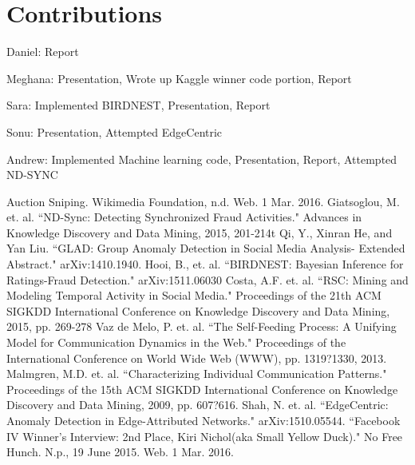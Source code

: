 \documentclass{article} %
\begin{document}
\section{Contributions}

Daniel: Report

Meghana: Presentation, Wrote up Kaggle winner code portion, Report

Sara: Implemented BIRDNEST, Presentation, Report

Sonu: Presentation, Attempted EdgeCentric 

Andrew: Implemented Machine learning code, Presentation, Report, Attempted ND-SYNC

\begin{thebibliography}{123}

 Auction Sniping. Wikimedia Foundation, n.d. Web. 1 Mar. 2016.
 Giatsoglou, M. et. al. ``ND-Sync: Detecting Synchronized Fraud Activities." Advances in Knowledge Discovery and Data Mining, 2015, 201-214t
 Qi, Y., Xinran He, and Yan Liu. ``GLAD: Group Anomaly Detection in Social Media Analysis- Extended Abstract." arXiv:1410.1940.
 Hooi, B., et. al. ``BIRDNEST: Bayesian Inference for Ratings-Fraud Detection." arXiv:1511.06030
 Costa, A.F. et. al. ``RSC: Mining and Modeling Temporal Activity in Social Media." Proceedings of the 21th ACM SIGKDD International Conference on Knowledge Discovery and Data Mining, 2015, pp. 269-278
 Vaz de Melo, P. et. al. ``The Self-Feeding Process: A Unifying Model for Communication Dynamics in the Web." Proceedings of the International Conference on World Wide Web (WWW), pp. 1319?1330, 2013.
 Malmgren, M.D. et. al. ``Characterizing Individual Communication Patterns." Proceedings of the 15th ACM SIGKDD International Conference on Knowledge Discovery and Data Mining, 2009, pp. 607?616.
 Shah, N. et. al. ``EdgeCentric: Anomaly Detection in Edge-Attributed Networks." arXiv:1510.05544.
 ``Facebook IV Winner's Interview: 2nd Place, Kiri Nichol(aka Small Yellow Duck)." No Free Hunch. N.p., 19 June 2015. Web. 1 Mar. 2016.

\end{thebibliography}
\end{document}
